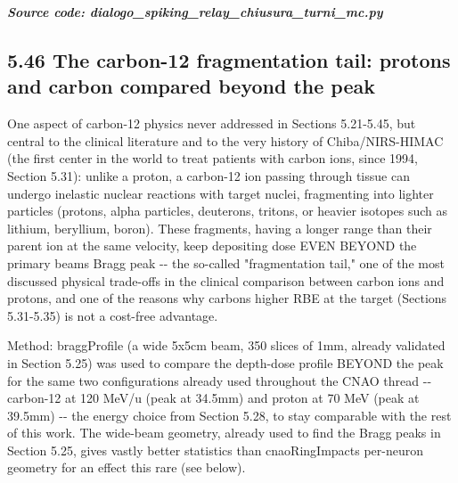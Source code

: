 \documentclass[
  english,
]{article}
\begin{document}
\textit{\textbf{Source code: dialogo\_\allowbreak{}spiking\_\allowbreak{}relay\_\allowbreak{}chiusura\_\allowbreak{}turni\_\allowbreak{}mc.py}}


\subsection{5.46 The carbon-12 fragmentation tail: protons and carbon compared beyond the peak}\label{the-carbon-12-fragmentation-tail-protons-and-carbon-compared-beyond-the-peak}

One aspect of carbon-12 physics never addressed in Sections 5.21-5.45, but central to the clinical literature and to the very history of Chiba/NIRS-HIMAC (the first center in the world to treat patients with carbon ions, since 1994, Section 5.31): unlike a proton, a carbon-12 ion passing through tissue can undergo inelastic nuclear reactions with target nuclei, fragmenting into lighter particles (protons, alpha particles, deuterons, tritons, or heavier isotopes such as lithium, beryllium, boron). These fragments, having a longer range than their parent ion at the same velocity, keep depositing dose EVEN BEYOND the primary beam\textquotesingle s Bragg peak -\/- the so-called "fragmentation tail," one of the most discussed physical trade-offs in the clinical comparison between carbon ions and protons, and one of the reasons why carbon\textquotesingle s higher RBE at the target (Sections 5.31-5.35) is not a cost-free advantage.

Method: braggProfile (a wide 5x5cm beam, 350 slices of 1mm, already validated in Section 5.25) was used to compare the depth-dose profile BEYOND the peak for the same two configurations already used throughout the CNAO thread -\/- carbon-12 at 120 MeV/u (peak at 34.5mm) and proton at 70 MeV (peak at 39.5mm) -\/- the energy choice from Section 5.28, to stay comparable with the rest of this work. The wide-beam geometry, already used to find the Bragg peaks in Section 5.25, gives vastly better statistics than cnaoRingImpact\textquotesingle s per-neuron geometry for an effect this rare (see below).
\end{document}
